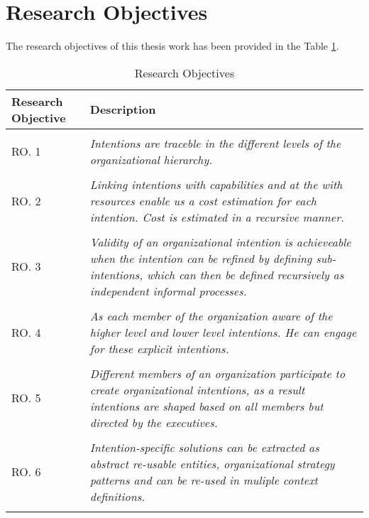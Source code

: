 \section {Research Objectives}
\label{sec:researchobjectives}
\label{sec:researchobj}
The research objectives of this thesis work has been provided in the Table \ref{tab:researchobjectives}.

\begin{center}
	\begin{longtable}{p{5cm}p{11cm}} 
   	\toprule 
	\textbf{Research Objective} & \textbf{Description} \\
	\midrule
	\endfirsthead
	\\
	RO. 1 & \textit{Intentions are traceble in the different levels of the organizational hierarchy. } \label{ro1} \\
	\\[-1.5ex]
	RO. 2 & \textit{Linking intentions with capabilities and at the with resources enable us a cost estimation for each intention. Cost is estimated in a recursive manner.} \label{ro2} \\
	\\[-1.5ex]
	RO. 3 & \textit{Validity of an organizational intention is achieveable when the intention can be refined by defining sub-intentions, which can then be defined recursively as independent informal processes.} \label{ro3}\\
	\\[-1.5ex]
	RO. 4 & \textit{As each member of the organization aware of the higher level and lower level intentions. He can engage for these explicit intentions. } \label{ro4}\\
	\\[-1.5ex]
	RO. 5 & \textit{Different members of an organization participate to create organizational intentions, as a result intentions are shaped based on all members but directed by the executives.} \label{ro5}\\
	\\[-1.5ex]
	RO. 6 & \textit{Intention-specific solutions can be extracted as abstract re-usable entities, organizational strategy patterns and can be re-used in muliple context definitions.} \label{ro6}\\
	
	\bottomrule
	\caption{Research Objectives}
	\label{tab:researchobjectives}
	\end{longtable}	
\end{center}

